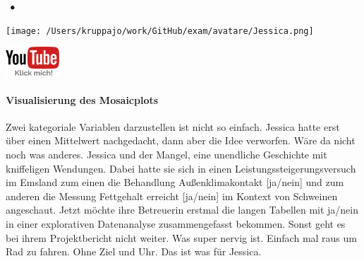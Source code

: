 \documentclass[a4paper, 9pt]{scrartcl}\usepackage[]{graphicx}\usepackage[]{xcolor}
\begin{document}
 
\ifcollection
\begin{flushright}
\tiny\vspace{-3Ex}
\textbf{\examinhaltstart}
\exammodulestat $\;\bullet$
\exammodulestatbbv 
\vspace{-4Ex}
\end{flushright}
\begin{minipage}[t]{0.5\textwidth}
\texttt{[image: /Users/kruppajo/work/GitHub/exam/avatare/Jessica.png]}
\end{minipage}
\begin{minipage}[t]{0.5\textwidth}
\hfill
\href{https://youtu.be/t_1KL77mfmg}{\includegraphics[width = 2cm]{img/youtube}}
\end{minipage}
\vspace{-3ex}
\fi



\ifcollection
\paragraph{Visualisierung des Mosaicplots}
\fi

Zwei kategoriale Variablen darzustellen ist nicht so einfach. Jessica hatte erst über einen Mittelwert nachgedacht, dann aber die Idee verworfen. Wäre da nicht noch was anderes. Jessica und der Mangel, eine unendliche Geschichte mit kniffeligen Wendungen. Dabei hatte sie sich in einen Leistungssteigerungsversuch im Emsland zum einen die Behandlung Außenklimakontakt [ja/nein] und zum anderen die Messung Fettgehalt erreicht [ja/nein] im Kontext von Schweinen angeschaut. Jetzt möchte ihre Betreuerin erstmal die langen Tabellen mit ja/nein in einer explorativen Datenanalyse zusammengefasst bekommen. Sonst geht es bei ihrem Projektbericht nicht weiter. Was super nervig ist. Einfach mal raus um Rad zu fahren. Ohne Ziel und Uhr. Das ist was für Jessica.



\vspace{1Ex}
\end{document}

